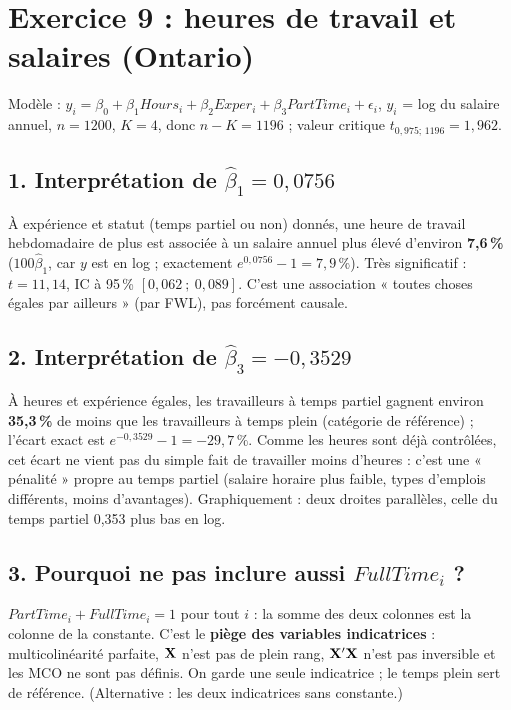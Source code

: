 \documentclass[11pt,a4paper]{article}
\begin{document}
\section{Exercice 9 : heures de travail et salaires (Ontario)}

Modèle : $y_i=\beta_0+\beta_1Hours_i+\beta_2Exper_i+\beta_3PartTime_i+\epsilon_i$, $y_i$ = log du salaire annuel, $n=1200$, $K=4$, donc $n-K=1196$ ; valeur critique $t_{0{,}975;\,1196}=1{,}962$.

\subsection*{1. Interprétation de $\hat\beta_1=0{,}0756$}
\begin{reponse}
À expérience et statut (temps partiel ou non) donnés, une heure de travail hebdomadaire de plus est associée à un salaire annuel plus élevé d'environ \textbf{7,6\,\%} ($100\hat\beta_1$, car $y$ est en log ; exactement $e^{0{,}0756}-1=7{,}9\,\%$). Très significatif : $t=11{,}14$, IC à 95\,\% $[0{,}062\ ;\ 0{,}089]$. C'est une association « toutes choses égales par ailleurs » (par FWL), pas forcément causale.
\end{reponse}

\subsection*{2. Interprétation de $\hat\beta_3=-0{,}3529$}
\begin{reponse}
À heures et expérience égales, les travailleurs à temps partiel gagnent environ \textbf{35,3\,\%} de moins que les travailleurs à temps plein (catégorie de référence) ; l'écart exact est $e^{-0{,}3529}-1=-29{,}7\,\%$. Comme les heures sont déjà contrôlées, cet écart ne vient pas du simple fait de travailler moins d'heures : c'est une « pénalité » propre au temps partiel (salaire horaire plus faible, types d'emplois différents, moins d'avantages). Graphiquement : deux droites parallèles, celle du temps partiel 0,353 plus bas en log.
\end{reponse}

\subsection*{3. Pourquoi ne pas inclure aussi $FullTime_i$ ?}
\begin{reponse}
$PartTime_i+FullTime_i=1$ pour tout $i$ : la somme des deux colonnes est la colonne de la constante. C'est le \textbf{piège des variables indicatrices} : multicolinéarité parfaite, $\mathbf{X}$ n'est pas de plein rang, $\mathbf{X}'\mathbf{X}$ n'est pas inversible et les MCO ne sont pas définis. On garde une seule indicatrice ; le temps plein sert de référence. (Alternative : les deux indicatrices sans constante.)
\end{reponse}
\end{document}
